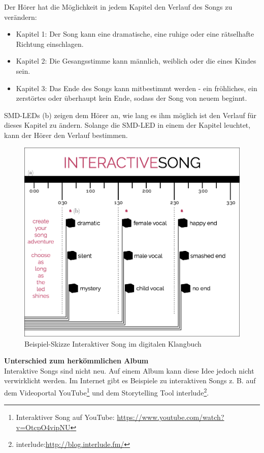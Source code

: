 Der Hörer hat die Möglichkeit in jedem Kapitel den Verlauf des Songs zu verändern:
\begin{itemize}
\item Kapitel 1: Der Song kann eine dramatische, eine ruhige oder eine rätselhafte Richtung einschlagen.
\item Kapitel 2: Die Gesangsstimme kann männlich, weiblich oder die eines Kindes sein.
\item Kapitel 3: Das Ende des Songs kann mitbestimmt werden - ein fröhliches, ein zerstörtes oder überhaupt kein Ende, sodass der Song von neuem beginnt.
\end{itemize} 

SMD-LEDs (b) zeigen dem Hörer an, wie lang es ihm möglich ist den Verlauf für dieses Kapitel zu ändern. Solange die SMD-LED in einem der Kapitel leuchtet, kann der Hörer den Verlauf bestimmen.


\begin{figure}[H]
\centering
\includegraphics[width=1.0\textwidth]{grafiken/function_interactivesong.png}
\caption{Beispiel-Skizze Interaktiver Song im digitalen Klangbuch}
\label{fig:abb1}
\end{figure}


\textbf{Unterschied zum herkömmlichen Album}\\
Interaktive Songs sind nicht neu. Auf einem Album kann diese Idee jedoch nicht verwirklicht werden. Im Internet gibt es Beispiele zu interaktiven Songs z. B. auf dem Videoportal YouTube\footnote{Interaktiver Song auf YouTube: \url{https://www.youtube.com/watch?v=OtcpO4vipNU}} und dem Storytelling Tool interlude\footnote{interlude:\url{http://blog.interlude.fm/}}.\\


